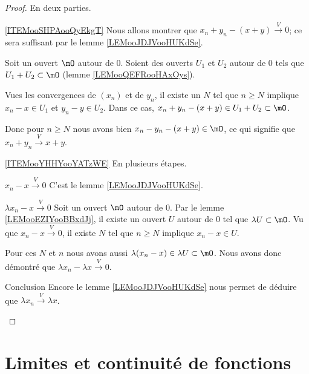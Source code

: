\begin{proof}
    En deux parties.
    \begin{subproof}
    \item[\ref{ITEMooSHPAooQyEkgT}]
    Nous allons montrer que \( x_n+y_n-(x+y)\stackrel{V}{\longrightarrow}0\); ce sera suffisant par le lemme \ref{LEMooJDJVooHUKdSe}.

    Soit un ouvert \( \mO\) autour de \( 0\). Soient des ouverts \( U_1\) et \( U_2\) autour de \( 0\) tels que \( U_1+U_2\subset \mO\) (lemme \ref{LEMooQEFRooHAxOys}).

    Vues les convergences de \( (x_n)\) et de \( y_n\), il existe un \( N\) tel que \( n\geq N\) implique \( x_n-x\in U_1\) et \( y_n-y\in U_2\). Dans ce cas, \( x_n+y_n-(x+y)\in U_1+U_2\subset \mO\).

    Donc pour \( n\geq N\) nous avons bien \( x_n-y_n-(x+y)\in \mO\), ce qui signifie que \( x_n+y_n\stackrel{V}{\longrightarrow}x+y\).
\item[\ref{ITEMooYHHYooYATzWE}]
        En plusieurs étapes.
        \begin{subproof}
        \item[\( x_n-x\stackrel{V}{\longrightarrow}0\)]
            C'est le lemme \ref{LEMooJDJVooHUKdSe}.
        \item[\( \lambda x_n-x\stackrel{V}{\longrightarrow}0\)]
            Soit un ouvert \( \mO\) autour de \( 0\). Par le lemme \ref{LEMooEZIYooBBxdJj}, il existe un ouvert \( U\) autour de \( 0\) tel que \( \lambda U\subset \mO\). Vu que \( x_n-x\stackrel{V}{\longrightarrow}0\), il existe \( N\) tel que \( n\geq N\) implique \( x_n-x\in U\).

            Pour ces \( N\) et \( n\) nous avons aussi \( \lambda (x_n-x)\in \lambda U\subset \mO\). Nous avons donc démontré que \( \lambda x_n-\lambda x\stackrel{V}{\longrightarrow}0\).
        \item[Conclusion]
            Encore le lemme \ref{LEMooJDJVooHUKdSe} nous permet de déduire que \( \lambda x_n\stackrel{V}{\longrightarrow}\lambda x\).
        \end{subproof}
    \end{subproof}
\end{proof}

\section{Limites et continuité de fonctions}

